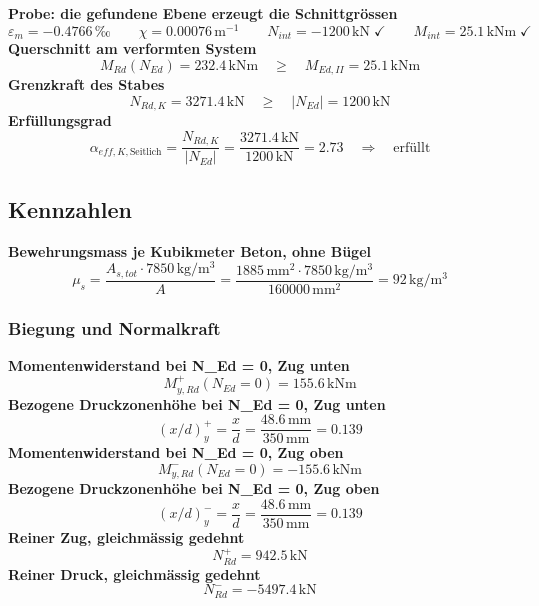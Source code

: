 \documentclass[11pt,a4paper]{article}
\begin{document}
\noindent\textbf{Probe: die gefundene Ebene erzeugt die Schnittgrössen}
\begin{equation*}
\varepsilon_m = -0.4766\,\text{‰} \qquad \chi = 0.00076\,\mathrm{m}^{-1} \qquad N_{int} = -1200\,\mathrm{kN} \;\checkmark \qquad M_{int} = 25.1\,\mathrm{kNm} \;\checkmark
\end{equation*}
\noindent\textbf{Querschnitt am verformten System}
\begin{equation*}
M_{Rd}(N_{Ed}) = 232.4\,\mathrm{kNm} \quad \ge \quad M_{Ed,II} = 25.1\,\mathrm{kNm}
\end{equation*}
\noindent\textbf{Grenzkraft des Stabes}
\begin{equation*}
N_{Rd,K} = 3271.4\,\mathrm{kN} \quad \ge \quad \left|N_{Ed}\right| = 1200\,\mathrm{kN}
\end{equation*}
\noindent\textbf{Erfüllungsgrad}
\begin{equation*}
\alpha_{eff,K,\text{Seitlich}} = \frac{N_{Rd,K}}{\left|N_{Ed}\right|} = \frac{3271.4\,\mathrm{kN}}{1200\,\mathrm{kN}} = 2.73 \quad \Rightarrow \quad \text{erfüllt}
\end{equation*}
\subsection{Kennzahlen}
\noindent\textbf{Bewehrungsmass je Kubikmeter Beton, ohne Bügel}
\begin{equation*}
\mu_s = \frac{A_{s,tot} \cdot 7850\,\mathrm{kg}/\mathrm{m}^{3}}{A} = \frac{1885\,\mathrm{mm}^{2} \cdot 7850\,\mathrm{kg}/\mathrm{m}^{3}}{160000\,\mathrm{mm}^{2}} = 92\,\mathrm{kg}/\mathrm{m}^{3}
\end{equation*}
\subsubsection{Biegung und Normalkraft}
\noindent\textbf{Momentenwiderstand bei N\_Ed = 0, Zug unten}
\begin{equation*}
M_{y,Rd}^{+}(N_{Ed} = 0) = 155.6\,\mathrm{kNm}
\end{equation*}
\noindent\textbf{Bezogene Druckzonenhöhe bei N\_Ed = 0, Zug unten}
\begin{equation*}
\left(x/d\right)_{y}^{+} = \frac{x}{d} = \frac{48.6\,\mathrm{mm}}{350\,\mathrm{mm}} = 0.139
\end{equation*}
\noindent\textbf{Momentenwiderstand bei N\_Ed = 0, Zug oben}
\begin{equation*}
M_{y,Rd}^{-}(N_{Ed} = 0) = -155.6\,\mathrm{kNm}
\end{equation*}
\noindent\textbf{Bezogene Druckzonenhöhe bei N\_Ed = 0, Zug oben}
\begin{equation*}
\left(x/d\right)_{y}^{-} = \frac{x}{d} = \frac{48.6\,\mathrm{mm}}{350\,\mathrm{mm}} = 0.139
\end{equation*}
\noindent\textbf{Reiner Zug, gleichmässig gedehnt}
\begin{equation*}
N_{Rd}^{+} = 942.5\,\mathrm{kN}
\end{equation*}
\noindent\textbf{Reiner Druck, gleichmässig gedehnt}
\begin{equation*}
N_{Rd}^{-} = -5497.4\,\mathrm{kN}
\end{equation*}
\end{document}
